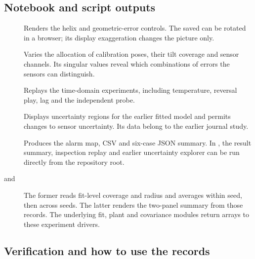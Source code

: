 \subsection{Notebook and script outputs}
\begin{description}
\item[] Renders the helix and geometric-error controls. The saved  can be rotated in a browser; its display exaggeration changes the picture only.
\item[] Varies the allocation of calibration poses, their tilt coverage and sensor channels. Its singular values reveal which combinations of errors the sensors can distinguish.
\item[] Replays the time-domain experiments, including temperature, reversal play, lag and the independent probe.
\item[] Displays uncertainty regions for the earlier fitted model and permits changes to sensor uncertainty. Its data belong to the earlier journal study.
\item[] Produces the alarm map, CSV and six-case JSON summary. In , the result summary, inspection replay and earlier uncertainty explorer can be run directly from the repository root.
\item[ and ] The former reads fit-level coverage and radius and averages within seed, then across seeds. The latter renders the two-panel summary from those records. The underlying fit, plant and covariance modules return arrays to these experiment drivers.
\end{description}
\clearpage\subsection{Verification and how to use the records}
